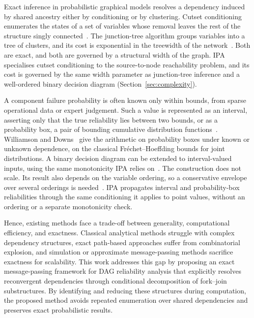 \documentclass[preprint,12pt]{elsarticle}
\begin{document}
Exact inference in probabilistic graphical models resolves a dependency induced by shared ancestry either by conditioning or by clustering. Cutset conditioning enumerates the states of a set of variables whose removal leaves the rest of the structure singly connected~\cite{pearl_probabilistic_1988}. The junction-tree algorithm groups variables into a tree of clusters, and its cost is exponential in the treewidth of the network~\cite{lauritzen_local_1988}. Both are exact, and both are governed by a structural width of the graph. IPA specialises cutset conditioning to the source-to-node reachability problem, and its cost is governed by the same width parameter as junction-tree inference and a well-ordered binary decision diagram (Section~\ref{sec:complexity}).

A component failure probability is often known only within bounds, from sparse operational data or expert judgement. Such a value is represented as an interval, asserting only that the true reliability lies between two bounds, or as a probability box, a pair of bounding cumulative distribution functions~\cite{ferson_constructing_2003}. Williamson and Downs~\cite{williamson_probabilistic_1990} give the arithmetic on probability boxes under known or unknown dependence, on the classical Fr\'echet--Hoeffding bounds for joint distributions. A binary decision diagram can be extended to interval-valued inputs, using the same monotonicity IPA relies on~\cite{jacob_uncertainty_2011}. The construction does not scale. Its result also depends on the variable ordering, so a conservative envelope over several orderings is needed~\cite{imakhlaf_extending_2017}. IPA propagates interval and probability-box reliabilities through the same conditioning it applies to point values, without an ordering or a separate monotonicity check.

Hence, existing methods face a trade-off between generality, computational efficiency, and exactness. Classical analytical methods struggle with complex dependency structures, exact path-based approaches suffer from combinatorial explosion, and simulation or approximate message-passing methods sacrifice exactness for scalability. This work addresses this gap by proposing an exact message-passing framework for DAG reliability analysis that explicitly resolves reconvergent dependencies through conditional decomposition of fork--join substructures. By identifying and reducing these structures during computation, the proposed method avoids repeated enumeration over shared dependencies and preserves exact probabilistic results.
\end{document}

